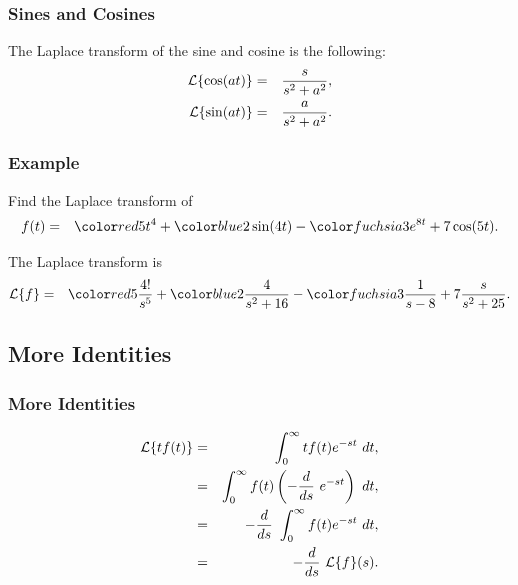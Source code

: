 \begin{frame}
  \frametitle{Sines and Cosines}

  The Laplace transform of the sine and cosine is the following:
  \begin{eqnarray*}
    \laplace{\cos(at)} & = & \frac{s}{s^2+a^2}, \\
    \laplace{\sin(at)} & = & \frac{a}{s^2+a^2}.
  \end{eqnarray*}


\end{frame}


\begin{frame}
  \frametitle{Example}

  Find the Laplace transform of 
  \begin{eqnarray*}
    f(t) & = & \redText{5t^4} + \blueText{2\sin(4t)} - \fuchsiaText{3 e^{8t}} + 7 \cos(5t).
  \end{eqnarray*}

  {

    The Laplace transform is
    \begin{eqnarray*}
      \laplace{f} & = & \redText{5 \frac{4!}{s^5}} + \blueText{2 \frac{4}{s^2+16}}  - \fuchsiaText{3\frac{1}{s-8}} + 7 \frac{s}{s^2+25}.
    \end{eqnarray*}

  }

\end{frame}

\subsection{More Identities}

\begin{frame}
  \frametitle{More Identities}

  \begin{eqnarray*}
    \laplace{t f(t)} & = & \int^\infty_0 t f(t) e^{-st} ~ dt, \\
    & = & \int^\infty_0 f(t) \lp -\deriv{~}{s} e^{-st} \rp ~ dt, \\
    & = & -\deriv{~}{s} \int^\infty_0 f(t) e^{-st}  ~ dt, \\
    & = & -\deriv{~}{s} \laplace{f}(s).
  \end{eqnarray*}

\end{frame}


